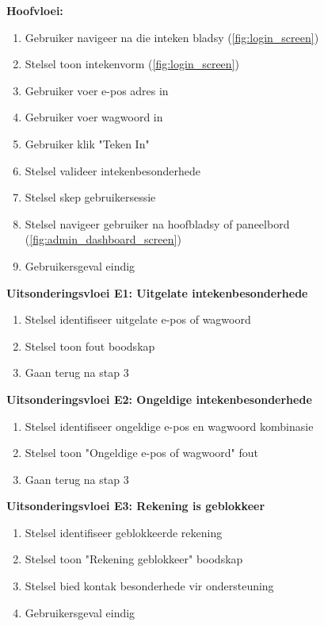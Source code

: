 \textbf{Hoofvloei:}
\begin{enumerate}
    \item Gebruiker navigeer na die inteken bladsy (\autoref{fig:login_screen})
    \item Stelsel toon intekenvorm (\autoref{fig:login_screen})
    \item Gebruiker voer e-pos adres in
    \item Gebruiker voer wagwoord in
    \item Gebruiker klik "Teken In"
    \item Stelsel valideer intekenbesonderhede
    \item Stelsel skep gebruikersessie
    \item Stelsel navigeer gebruiker na hoofbladsy of paneelbord (\autoref{fig:admin_dashboard_screen})
    \item Gebruikersgeval eindig
\end{enumerate}

\textbf{Uitsonderingsvloei E1: Uitgelate intekenbesonderhede}
\begin{enumerate}
    \item[6a.] Stelsel identifiseer uitgelate e-pos of wagwoord
    \item Stelsel toon fout boodskap
    \item Gaan terug na stap 3
\end{enumerate}

\textbf{Uitsonderingsvloei E2: Ongeldige intekenbesonderhede}
\begin{enumerate}
    \item[6b.] Stelsel identifiseer ongeldige e-pos en wagwoord kombinasie
    \item Stelsel toon "Ongeldige e-pos of wagwoord" fout
    \item Gaan terug na stap 3
\end{enumerate}

\textbf{Uitsonderingsvloei E3: Rekening is geblokkeer}
\begin{enumerate}
    \item[6c.] Stelsel identifiseer geblokkeerde rekening
    \item Stelsel toon "Rekening geblokkeer" boodskap
    \item Stelsel bied kontak besonderhede vir ondersteuning
    \item Gebruikersgeval eindig
\end{enumerate}

